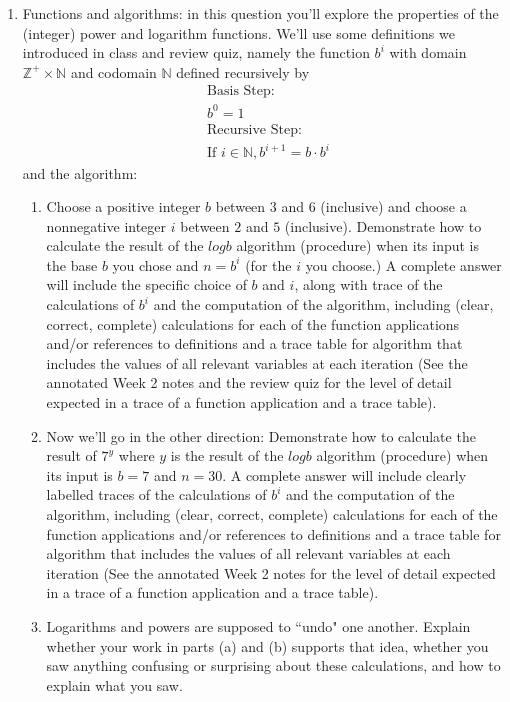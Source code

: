 \begin{enumerate}[labelindent=0pt, leftmargin=0pt]
\item Functions and algorithms: in this question you'll explore the properties of the (integer) power and logarithm
functions. We'll use some definitions we introduced in class and review quiz, namely the function
$b^i$ with domain $\mathbb{Z}^+ \times \mathbb{N}$ and codomain $\mathbb{N}$ defined recursively by
\begin{align*}    
&\textrm{Basis Step:} \\
&b^0 = 1 \\
&\textrm{Recursive Step:}\\
&\textrm{If } i \in \mathbb{N}, b^{i+1} = b \cdot b^i
\end{align*}
and the algorithm:



    \begin{enumerate}
    \item Choose a positive integer $b$ between $3$ and $6$ (inclusive) and choose a 
    nonnegative integer $i$ between $2$ and $5$ (inclusive). Demonstrate how to calculate 
    the result of the $logb$ algorithm (procedure) when its input is the base $b$ you chose and
    $n = b^i$ (for the $i$ you choose.) 
    A complete answer will include the specific choice of $b$ and $i$, along with 
    trace of the calculations of $b^i$ and the computation of the algorithm, including 
    (clear, correct, complete) calculations for each of the function applications 
    and/or references to definitions and a trace table for algorithm that includes the values of all relevant 
    variables at each iteration (See the annotated Week 2 notes and the review quiz for the level of detail expected
    in a trace of a function application and a trace table).
    \item Now we'll go in the other direction: Demonstrate how to calculate the result of 
    $7^y$ where $y$ is the result of the $logb$ algorithm (procedure) when its input is $b=7$ and $n=30$.
    A complete answer will include clearly labelled 
    traces of the calculations of $b^i$ and the computation of the algorithm, including 
    (clear, correct, complete) calculations for each of the function applications 
    and/or references to definitions and a trace table for algorithm that includes the values of all relevant 
    variables at each iteration (See the annotated Week 2 notes for the level of detail expected
    in a trace of a function application and a trace table).    
    \item Logarithms and powers are supposed to ``undo" one another. Explain whether your work in parts (a) and (b)
    supports that idea,  whether you saw anything confusing or surprising about these calculations, and how to explain what you saw.
    \end{enumerate}


\end{enumerate}
